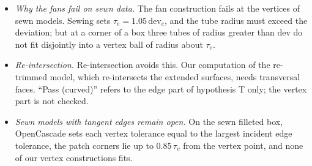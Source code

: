 \begin{itemize}
\item \emph{Why the fans fail on sewn data.} The fan construction fails at the vertices of sewn models. Sewing sets
$\tau_e=1.05\,\mathrm{dev}_e$, and the tube radius must exceed the deviation; but at a corner of a box three tubes of
radius greater than $\mathrm{dev}$ do not fit disjointly into a vertex ball of radius about $\tau_e$.
\item \emph{Re-intersection.} Re-intersection avoids this. Our computation of the re-trimmed model, which
re-intersects the extended surfaces, needs transversal faces. ``Pass (curved)'' refers to the edge part of hypothesis T
only; the vertex part is not checked.
\item \emph{Sewn models with tangent edges remain open.} On the sewn filleted box, OpenCascade sets each vertex
tolerance equal to the largest incident edge tolerance, the patch corners lie up to $0.85\,\tau_v$ from the vertex
point, and none of our vertex constructions fits.
\end{itemize}

